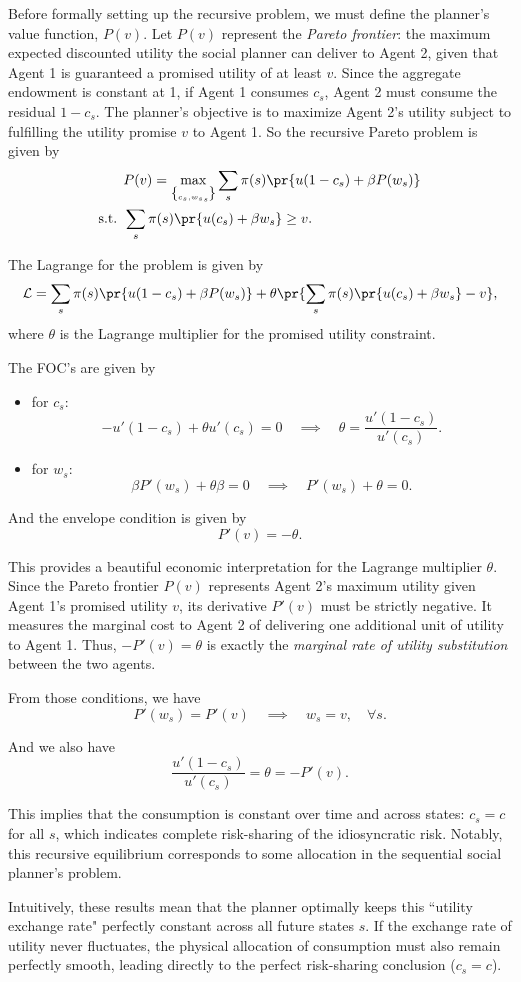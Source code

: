 Before formally setting up the recursive problem, we must define the planner's value function, $P(v)$. Let $P(v)$ represent the \textit{Pareto frontier}: the maximum expected discounted utility the social planner can deliver to Agent 2, given that Agent 1 is guaranteed a promised utility of at least $v$.  Since the aggregate endowment is constant at 1, if Agent 1 consumes $c_s$, Agent 2 must consume the residual $1-c_s$. The planner's objective is to maximize Agent 2's utility subject to fulfilling the utility promise $v$ to Agent 1. So the recursive Pareto problem is given by
\[
\begin{aligned}
    & P(v) = \max_{\brace{c_s,w_s}_s} \sum_s\pi(s)\pr{u(1-c_s)+\beta P(w_s)}\\
    \text{s.t. } & \sum_s\pi(s)\pr{u(c_s)+\beta w_s} \ge v.
\end{aligned}
\]

The Lagrange for the problem is given by
\[
\mathcal{L} = \sum_s\pi(s)\pr{u(1-c_s)+\beta P(w_s)} + \theta \pr{\sum_s\pi(s)\pr{u(c_s)+\beta w_s} - v},
\]
where $\theta$ is the Lagrange multiplier for the promised utility constraint.

The FOC's are given by
\begin{itemize}
    \item for $c_s$:
    \[
    -u'(1-c_s) + \theta u'(c_s) = 0 \quad \implies \quad \theta = \frac{u'(1-c_s)}{u'(c_s)}.
    \]
    \item for $w_s$:
    \[
    \beta P'(w_s) + \theta \beta = 0 \quad \implies \quad P'(w_s) +\theta = 0.
    \]
\end{itemize}

And the envelope condition is given by
\[P'(v) = -\theta.
\]

This provides a beautiful economic interpretation for the Lagrange multiplier $\theta$. Since the Pareto frontier $P(v)$ represents Agent 2's maximum utility given Agent 1's promised utility $v$, its derivative $P'(v)$ must be strictly negative. It measures the marginal cost to Agent 2 of delivering one additional unit of utility to Agent 1. Thus, $-P'(v) = \theta$ is exactly the \textit{marginal rate of utility substitution} between the two agents.

From those conditions, we have
\[P'(w_s) = P'(v) \quad \implies \quad w_s = v, \quad \forall s.
\]

And we also have
\[
\frac{u'(1-c_s)}{u'(c_s)} = \theta = -P'(v).
\]

This implies that the consumption is constant over time and across states: $c_s = c$ for all $s$, which indicates complete risk-sharing of the idiosyncratic risk. Notably, this recursive equilibrium corresponds to some allocation in the sequential social planner's problem. 

Intuitively, these results mean that the planner optimally keeps this ``utility exchange rate" perfectly constant across all future states $s$. If the exchange rate of utility never fluctuates, the physical allocation of consumption must also remain perfectly smooth, leading directly to the perfect risk-sharing conclusion ($c_s = c$).

